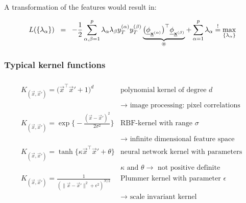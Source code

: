 \begin{frame}
A transformation of the features would result in:

\slidesonly{\vspace{-3mm}}
\begin{equation} 
    L(\{\lambda_\alpha\})
        \;\;=\;\;  -\frac{1}{2} \sum\limits_{\alpha, \beta = 1}^p 
        \lambda_\alpha \lambda_\beta y_T^{(\alpha)}
        y_T^{(\beta)} 
        \underbrace{\big( \underline{\mathbf{\phi}}_{\underline{\mathbf{x}}^{(\alpha)}} \big)^\top 
            \underline{\mathbf{\phi}}_{\underline{\mathbf{x}}^{(\beta)}}}_{ \circledast }
        + \sum\limits_{\alpha = 1}^p \lambda_\alpha{}
        \stackrel{\mathrm{!}}{=} \max_{\{\lambda_\alpha\}}
\end{equation}
    
\end{frame}

\subsubsection{Typical kernel functions}

\begin{frame}\frametitle{\subsubsecname}
	\[ \begin{array}{ll}
		K_{(\vec{x}, \vec{x}')} = \big( \vec{x}^\top \vec{x}' + 1 \big)^d
		& \text{polynomial kernel of degree } d\\ 
		& \rightarrow \text{ image processing: pixel correlations} \\[4mm]
		K_{(\vec{x}, \vec{x}')} = \exp \Big\{ -\frac{(\vec{x} - \vec{x}')^2}{
			2 \sigma^2} \Big\}
		& \text{RBF-kernel with range } \sigma \\[-1mm]  
		& \rightarrow \text{ infinite dimensional feature space} \\[4mm]
		K_{(\vec{x}, \vec{x}')} = \tanh \big\{ \kappa \vec{x}^\top \vec{x}' + \theta
			\big\}
		& \text{neural network kernel with parameters } \\ 
		&	\kappa \text{ and } \theta 
			\rightarrow \text{ not positive definite} \\[4mm]
		K_{(\vec{x}, \vec{x}')} = \frac{1}{ (\|\vec{x} - \vec{x}'\|^2 
			+ \epsilon^2 )^{N/2}}
		& \text{Plummer kernel with parameter } \epsilon \\[-1mm]
		& \rightarrow \text{ scale invariant kernel}
	\end{array} \]
\end{frame}

